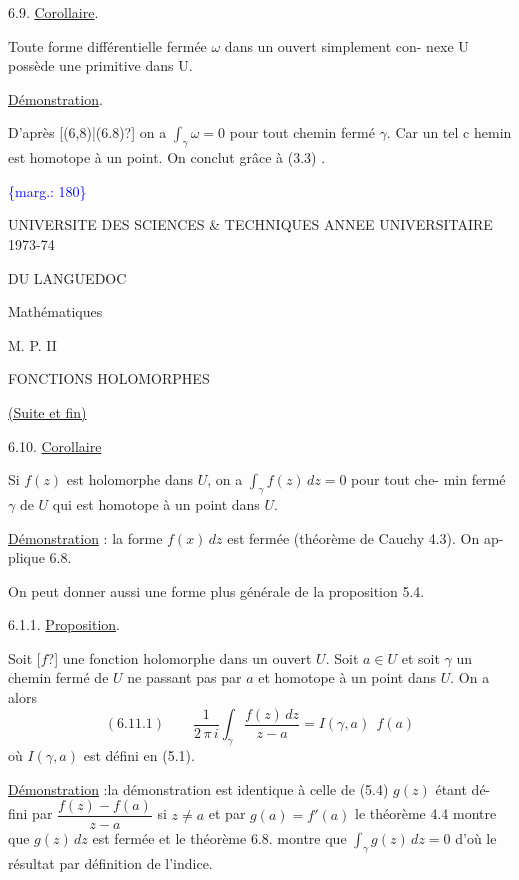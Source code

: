 \documentclass[11pt]{article}
\newcommand{\scanpage}[1]{\par\bigskip\noindent{\small\sffamily[scan #1]}\par}
\newcommand{\margin}[1]{\textcolor{blue}{\{\textsf{marg.:} #1\}}}
\newcommand{\uline}[1]{\underline{#1}}
\newcommand{\unsure}[1]{[#1?]}
\begin{document}
6.9. \uline{Corollaire}.

Toute forme différentielle fermée $\omega$ dans un ouvert simplement con-%
nexe U possède une primitive dans U.

\uline{Démonstration}.

D'après \unsure{(6,8)|(6.8)} on a $\int_{\gamma} \omega = 0$ pour tout chemin fermé $\gamma$. Car un
tel c hemin est homotope à un point. On conclut grâce à (3.3) .

\margin{180}

\clearpage
\scanpage{119/182}
UNIVERSITE DES SCIENCES \& TECHNIQUES \qquad ANNEE UNIVERSITAIRE 1973-74

DU LANGUEDOC

Mathématiques

M. P. II

FONCTIONS HOLOMORPHES

\uline{(Suite et fin)}

6.10. \uline{Corollaire}

Si $f(z)$ est holomorphe dans $U$, on a $\int_{\gamma} f(z)\,dz = 0$ pour tout che-%
min fermé $\gamma$ de $U$ qui est homotope à un point dans $U$.

\uline{Démonstration} : la forme $f(x)\,dz$ est fermée (théorème de Cauchy 4.3). On ap-%
plique 6.8.

On peut donner aussi une forme plus générale de la proposition 5.4.

6.1.1. \uline{Proposition}.

Soit \unsure{$f$} une fonction holomorphe dans un ouvert $U$. Soit $a \in U$ et
soit $\gamma$ un chemin fermé de $U$ ne passant pas par $a$ et homotope à un point
dans $U$. On a alors
\[ (6.11.1) \qquad \frac{1}{2\,\pi\, i}\int_{\gamma} \frac{f(z)\,dz}{z-a} = I(\gamma,a)\ \ f(a) \]
où $I(\gamma,a)$ est défini en (5.1).

\uline{Démonstration} :la démonstration est identique à celle de (5.4) $g(z)$ étant dé-%
fini par $\dfrac{f(z) - f(a)}{z-a}$ si $z \neq a$ et par $g(a) = f'(a)$ le théorème 4.4 montre
que $g(z)\,dz$ est fermée et le théorème 6.8. montre que $\int_{\gamma} g(z)\,dz = 0$ d'où
le résultat par définition de l'indice.
\end{document}
